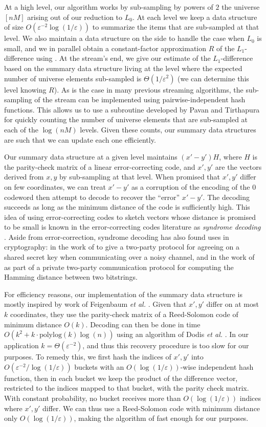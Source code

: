\documentclass[letterpaper,11pt]{article}
\newcommand{\polylog}{{\mathrm{polylog}}}
\newcommand{\eps}{\varepsilon}
\begin{document}
At a high level, our algorithm works by sub-sampling by powers of $2$
the universe $[nM]$ arising out of our reduction to $L_0$. At each
level we keep a data structure of size
$O(\eps^{-2}\log(1/\eps))$ to summarize the items that are
sub-sampled at that level. We also maintain a
data structure on the side to handle the case when $L_0$ is
small, and we in parallel obtain a constant-factor approximation $R$
of the $L_1$-difference using \cite{FKSV02}. At the stream's end, we
give our estimate of the $L_1$-difference based on the summary data
structure living at the level where the expected number of universe
elements sub-sampled is $\Theta(1/\eps^2)$ (we can
determine this level knowing $R$).
As is the case in many previous streaming algorithms, the sub-sampling
of the stream can be
implemented using pairwise-independent hash functions. This allows us
to use a subroutine developed by Pavan and Tirthapura
\cite{PavanTir07} for quickly counting the number of universe elements
that
are sub-sampled at each of the $\log(nM)$ levels. Given these counts,
our summary data structures are such that we can update each one
efficiently.

Our summary data structure at a given level maintains $(x'-y')H$,
where $H$ is the parity-check matrix of
a linear error-correcting code, and $x',y'$ are the vectors derived
from $x,y$ by sub-sampling at that level. When promised that
$x',y'$ differ on few coordinates, we can treat $x'-y'$ as
a corruption of the encoding of the $0$ codeword then attempt to
decode to recover the ``error'' $x'-y'$. The decoding succeeds as long
as the minimum distance of the code is sufficiently high. This idea of
using error-correcting codes to
sketch vectors whose distance is promised to be small is known in the
error-correcting codes literature as {\em
  syndrome decoding} \cite{Wyner74}. Aside from error-correction,
syndrome decoding has also
found uses in cryptography: in the work of
\cite{BBR88,Smith07} to give a two-party protocol
for agreeing on a shared secret key when communicating over a noisy
channel, and in the work of \cite{FIMNSW06} as part of a private
two-party communication protocol for computing the Hamming distance
between two bitstrings.

For efficiency reasons, our implementation of the summary data
structure is mostly inspired by work of Feigenbaum {\it et al.}
\cite{FIMNSW06}. Given that
$x',y'$ differ on at most $k$ coordinates, they use the parity-check
matrix of a Reed-Solomon code of minimum distance $O(k)$.  Decoding
can then be done in time $O(k^2 + k\cdot \polylog(k)\log(n))$ using
an algorithm of Dodis {\it et al.} \cite{DORS08}. In our
application $k =
\Theta(\eps^{-2})$, and thus this recovery procedure is too slow for our
purposes.  To remedy this, we first hash the indices of $x',y'$
into $O(\eps^{-2}/\log(1/\eps))$ buckets with an
$O(\log(1/\eps))$-wise independent hash function, then in each bucket
we keep the product of the difference vector, restricted to the
indices mapped to that bucket, with the parity check matrix.
With constant probability, no bucket receives more than
$O(\log(1/\eps))$ indices where $x',y'$ differ.
We can thus use a Reed-Solomon code
with minimum distance only $O(\log(1/\eps))$, making the algorithm of
\cite{DORS08} fast enough for our purposes.
\end{document}
